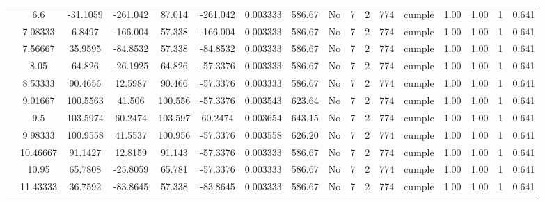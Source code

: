 \begin{table}[H]
{\begin{tabular}{|c|c|c|c|c|c|c|c|c|c|c|c|c|c|c|c|c|}
\cline{2-17}    & \cellcolor[rgb]{ .851,  .882,  .949}6.6 & -31.1059 & -261.042 & 87.014 & -261.042 & 0.003333 & 586.67 & No  & 7   & 2   & 774 & \cellcolor[rgb]{ .776,  .937,  .808}cumple & 1.00 & 1.00 & 1   & 0.641 \bigstrut\\
\cline{2-17}    & 7.08333 & 6.8497 & -166.004 & 57.338 & -166.004 & 0.003333 & 586.67 & No  & 7   & 2   & 774 & \cellcolor[rgb]{ .776,  .937,  .808}cumple & 1.00 & 1.00 & 1   & 0.641 \bigstrut\\
\cline{2-17}    & 7.56667 & 35.9595 & -84.8532 & 57.338 & -84.8532 & 0.003333 & 586.67 & No  & 7   & 2   & 774 & \cellcolor[rgb]{ .776,  .937,  .808}cumple & 1.00 & 1.00 & 1   & 0.641 \bigstrut\\
\cline{2-17}    & 8.05 & 64.826 & -26.1925 & 64.826 & -57.3376 & 0.003333 & 586.67 & No  & 7   & 2   & 774 & \cellcolor[rgb]{ .776,  .937,  .808}cumple & 1.00 & 1.00 & 1   & 0.641 \bigstrut\\
\cline{2-17}    & 8.53333 & 90.4656 & 12.5987 & 90.466 & -57.3376 & 0.003333 & 586.67 & No  & 7   & 2   & 774 & \cellcolor[rgb]{ .776,  .937,  .808}cumple & 1.00 & 1.00 & 1   & 0.641 \bigstrut\\
\cline{2-17}    & 9.01667 & 100.5563 & 41.506 & 100.556 & -57.3376 & 0.003543 & 623.64 & No  & 7   & 2   & 774 & \cellcolor[rgb]{ .776,  .937,  .808}cumple & 1.00 & 1.00 & 1   & 0.641 \bigstrut\\
\cline{2-17}    & 9.5 & 103.5974 & 60.2474 & 103.597 & 60.2474 & 0.003654 & 643.15 & No  & 7   & 2   & 774 & \cellcolor[rgb]{ .776,  .937,  .808}cumple & 1.00 & 1.00 & 1   & 0.641 \bigstrut\\
\cline{2-17}    & 9.98333 & 100.9558 & 41.5537 & 100.956 & -57.3376 & 0.003558 & 626.20 & No  & 7   & 2   & 774 & \cellcolor[rgb]{ .776,  .937,  .808}cumple & 1.00 & 1.00 & 1   & 0.641 \bigstrut\\
\cline{2-17}    & 10.46667 & 91.1427 & 12.8159 & 91.143 & -57.3376 & 0.003333 & 586.67 & No  & 7   & 2   & 774 & \cellcolor[rgb]{ .776,  .937,  .808}cumple & 1.00 & 1.00 & 1   & 0.641 \bigstrut\\
\cline{2-17}    & 10.95 & 65.7808 & -25.8059 & 65.781 & -57.3376 & 0.003333 & 586.67 & No  & 7   & 2   & 774 & \cellcolor[rgb]{ .776,  .937,  .808}cumple & 1.00 & 1.00 & 1   & 0.641 \bigstrut\\
\cline{2-17}    & 11.43333 & 36.7592 & -83.8645 & 57.338 & -83.8645 & 0.003333 & 586.67 & No  & 7   & 2   & 774 & \cellcolor[rgb]{ .776,  .937,  .808}cumple & 1.00 & 1.00 & 1   & 0.641 \bigstrut\\

\end{tabular}}
\end{table}
